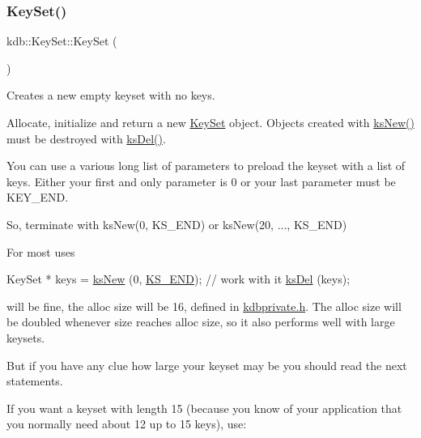\subsubsection{\texorpdfstring{Key\+Set()}{KeySet()}\hspace{0.1cm}{\footnotesize\ttfamily [1/5]}}
{\footnotesize\ttfamily kdb\+::\+Key\+Set\+::\+Key\+Set (\begin{DoxyParamCaption}{ }\end{DoxyParamCaption})\hspace{0.3cm}{\ttfamily [inline]}}



Creates a new empty keyset with no keys. 

Allocate, initialize and return a new \hyperlink{classkdb_1_1KeySet}{Key\+Set} object. Objects created with \hyperlink{group__keyset_ga671e1aaee3ae9dc13b4834a4ddbd2c3c}{ks\+New()} must be destroyed with \hyperlink{group__keyset_ga27e5c16473b02a422238c8d970db7ac8}{ks\+Del()}.

You can use a various long list of parameters to preload the keyset with a list of keys. Either your first and only parameter is 0 or your last parameter must be K\+E\+Y\+\_\+\+E\+ND.

So, terminate with ks\+New(0, K\+S\+\_\+\+E\+N\+D) or ks\+New(20, ..., K\+S\+\_\+\+E\+ND)

For most uses


\begin{DoxyCodeInclude}
KeySet * keys = \hyperlink{group__keyset_ga671e1aaee3ae9dc13b4834a4ddbd2c3c}{ksNew} (0, \hyperlink{kdbenum_8c_a7a28fce3773b2c873c94ac80b8b4cd54}{KS\_END});
\textcolor{comment}{// work with it}
\hyperlink{group__keyset_ga27e5c16473b02a422238c8d970db7ac8}{ksDel} (keys);
\end{DoxyCodeInclude}
 will be fine, the alloc size will be 16, defined in \hyperlink{kdbprivate_8h}{kdbprivate.\+h}. The alloc size will be doubled whenever size reaches alloc size, so it also performs well with large keysets.

But if you have any clue how large your keyset may be you should read the next statements.

If you want a keyset with length 15 (because you know of your application that you normally need about 12 up to 15 keys), use\+:


